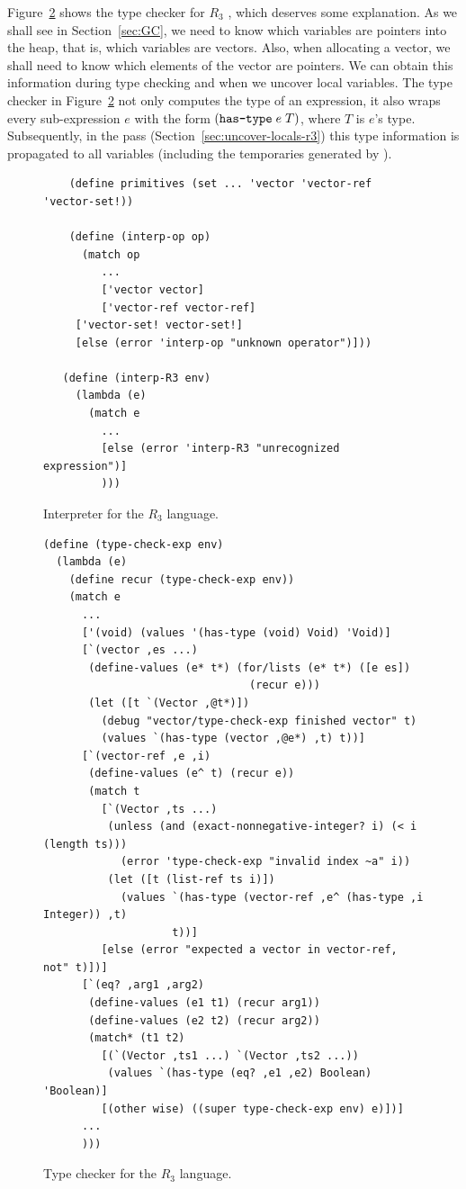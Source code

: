 \documentclass[11pt]{book}
\begin{document}
Figure~\ref{fig:typecheck-R3} shows the type checker for $R_3$ , which
deserves some explanation. As we shall see in Section~\ref{sec:GC}, we
need to know which variables are pointers into the heap, that is,
which variables are vectors. Also, when allocating a vector, we shall
need to know which elements of the vector are pointers. We can obtain
this information during type checking and when we uncover local
variables. The type checker in Figure~\ref{fig:typecheck-R3} not only
computes the type of an expression, it also wraps every sub-expression
$e$ with the form $(\texttt{has-type}\; e\; T)$, where $T$ is $e$'s
type. Subsequently, in the  pass
(Section~\ref{sec:uncover-locals-r3}) this type information is
propagated to all variables (including the temporaries generated by
).

\begin{figure}[tbp]
\begin{lstlisting}
    (define primitives (set ... 'vector 'vector-ref 'vector-set!))

    (define (interp-op op)
      (match op
         ...
         ['vector vector]
         ['vector-ref vector-ref]
	 ['vector-set! vector-set!]
	 [else (error 'interp-op "unknown operator")]))

   (define (interp-R3 env)
     (lambda (e)
       (match e
         ...
         [else (error 'interp-R3 "unrecognized expression")]
         )))
\end{lstlisting}
\caption{Interpreter for the $R_3$ language.}
\label{fig:interp-R3}
\end{figure}

\begin{figure}[tbp]
\begin{lstlisting}
(define (type-check-exp env)
  (lambda (e)
    (define recur (type-check-exp env))
    (match e
      ...
      ['(void) (values '(has-type (void) Void) 'Void)]
      [`(vector ,es ...)
       (define-values (e* t*) (for/lists (e* t*) ([e es])
                                (recur e)))
       (let ([t `(Vector ,@t*)])
         (debug "vector/type-check-exp finished vector" t)
         (values `(has-type (vector ,@e*) ,t) t))]
      [`(vector-ref ,e ,i)
       (define-values (e^ t) (recur e))
       (match t
         [`(Vector ,ts ...)
          (unless (and (exact-nonnegative-integer? i) (< i (length ts)))
            (error 'type-check-exp "invalid index ~a" i))
          (let ([t (list-ref ts i)])
            (values `(has-type (vector-ref ,e^ (has-type ,i Integer)) ,t) 
                    t))]
         [else (error "expected a vector in vector-ref, not" t)])]
      [`(eq? ,arg1 ,arg2)
       (define-values (e1 t1) (recur arg1))
       (define-values (e2 t2) (recur arg2))
       (match* (t1 t2)
         [(`(Vector ,ts1 ...) `(Vector ,ts2 ...))
          (values `(has-type (eq? ,e1 ,e2) Boolean) 'Boolean)]
         [(other wise) ((super type-check-exp env) e)])]
      ...
      )))
\end{lstlisting}
\caption{Type checker for the $R_3$ language.}
\label{fig:typecheck-R3}
\end{figure}
\end{document}
